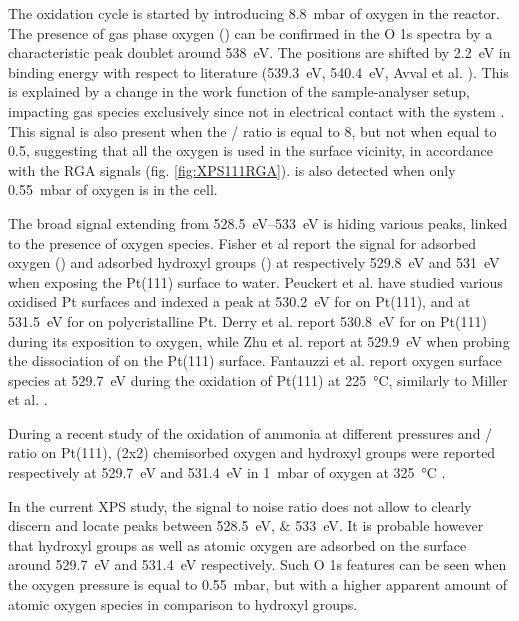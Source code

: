 The oxidation cycle is started by introducing \qty{8.8}{\milli\bar} of oxygen in the reactor.
The presence of gas phase oxygen () can be confirmed in the O 1s spectra by a characteristic peak doublet around \qty{538}{\eV}.
The positions are shifted by \qty{2.2}{\eV} in binding energy with respect to literature (\qty{539.3}{\eV}, \qty{540.4}{\eV}, Avval et al. \cite*{Avval2022}).
This is explained by a change in the work function of the sample-analyser setup, impacting gas species exclusively since not in electrical contact with the system \parencite{Starr2021}.
This signal is also present when the / ratio is equal to 8, but not when equal to 0.5, suggesting that all the oxygen is used in the surface vicinity, in accordance with the RGA signals (fig. \ref{fig:XPS111RGA}).
 is also detected when only \qty{0.55}{\milli\bar} of oxygen is in the cell.

The broad signal extending from \qtyrange{528.5}{533}{\eV} is hiding various peaks, linked to the presence of oxygen species.
Fisher et al \parencite*{Fisher1980} report the signal for adsorbed oxygen () and adsorbed hydroxyl groups () at respectively \qty{529.8}{\eV} and \qty{531}{\eV} when exposing the Pt(111) surface to water.
Peuckert et al. \parencite*{Peuckert1984} have studied various oxidised Pt surfaces and indexed a peak at \qty{530.2}{\eV} for  on Pt(111), and at \qty{531.5}{\eV} for  on polycristalline Pt.
Derry et al. \parencite*{Derry1984} report \qty{530.8}{\eV} for  on Pt(111) during its exposition to oxygen, while Zhu et al. \parencite*{Zhu2003} report  at \qty{529.9}{\eV} when probing the dissociation of  on the Pt(111) surface.
Fantauzzi et al. \parencite*{Fantauzzi2017} report oxygen surface species at \qty{529.7}{\eV} during the oxidation of Pt(111) at \qty{225}{\degreeCelsius}, similarly to Miller et al. \parencite*{Miller2014}.

During a recent study of the oxidation of ammonia at different pressures and / ratio on Pt(111), (2x2) chemisorbed oxygen and hydroxyl groups were reported respectively at \qty{529.7}{\eV} and \qty{531.4}{\eV} in \qty{1}{\milli\bar} of oxygen at \qty{325}{\degreeCelsius} \parencite{Ivashenko2021}.

In the current XPS study, the signal to noise ratio does not allow to clearly discern and locate peaks between \qtylist{528.5;533}{\eV}.
It is probable however that hydroxyl groups as well as atomic oxygen are adsorbed on the surface around \qty{529.7}{\eV} and \qty{531.4}{\eV} respectively.
Such O 1s features can be seen when the oxygen pressure is equal to \qty{0.55}{\milli\bar}, but with a higher apparent amount of atomic oxygen species in comparison to hydroxyl groups.

